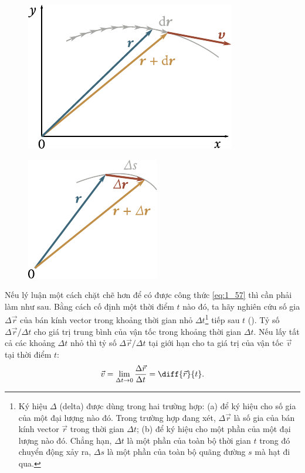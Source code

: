 \begin{figure}[!htb]
	\begin{minipage}[t]{0.5\linewidth}
		\begin{center}
			\includegraphics[scale=0.90]{figures/ch_01/fig_1_22.pdf}
			\caption[]{}
			\label{fig:1_22}
		\end{center}
	\end{minipage}
	\hfill{ }%
	\begin{minipage}[t]{0.5\linewidth}
		\begin{center}
			\includegraphics[scale=0.92]{figures/ch_01/fig_1_23.pdf}
			\caption[]{}
			\label{fig:1_23}
		\end{center}
	\end{minipage}
\end{figure}

Nếu lý luận một cách chặt chẽ hơn để có được công thức \eqref{eq:1_57} thì cần phải làm như sau. Bằng cách cố định một thời điểm $t$ nào đó, ta hãy nghiên cứu số gia $\Delta\vec{r}$ của bán kính vector trong khoảng thời gian nhỏ $\Delta t$\footnote{Ký hiệu $\Delta$ (delta) được dùng trong hai trường hợp: (a) để ký hiệu cho số gia của một đại lượng nào đó. Trong trường hợp đang xét, $\Delta\vec{r}$ là số gia của bán kính vector $\vec{r}$ trong thời gian $\Delta t$; (b) để ký hiệu cho một phần của một đại lượng nào đó. Chẳng hạn, $\Delta t$ là một phần của toàn bộ thời gian $t$ trong đó chuyển động xảy ra, $\Delta s$ là một phần của toàn bộ quãng đường $s$ mà hạt đi qua.} tiếp sau $t$ (). Tỷ số $\Delta\vec{r}/\Delta t$ cho giá trị trung bình của vận tốc trong khoảng thời gian $\Delta t$. Nếu lấy tất cả các khoảng $\Delta t$ nhỏ thì tỷ số $\Delta\vec{r}/\Delta t$ tại giới hạn cho ta giá trị của vận tốc $\vec{v}$ tại thời điểm $t$:
\begin{equation}\label{eq:1_58}
\vec{v} = \lim_{\Delta t\to 0} \frac{\Delta\vec{r}}{\Delta t} = \diff{\vec{r}}{t}.
\end{equation}

